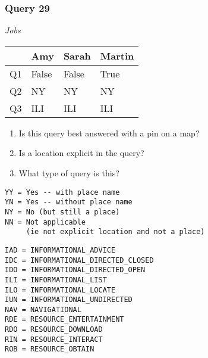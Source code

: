 \begin{frame}[fragile]
\frametitle{Query 29}
\vspace{1em}

\emph{Jobs}

\vfill

\begin{table}
  \centering
  \begin{tabular}{ l l l l }
    & \textbf{Amy} & \textbf{Sarah} & \textbf{Martin}\\
    \toprule
    Q1 & False & False & True\\
Q2 & NY & NY & NY\\
Q3 & ILI & ILI & ILI\\
    \bottomrule
  \end{tabular}
\end{table}

\vfill

\tiny{

\begin{enumerate}
\item Is this query best answered with a pin on a map?
\item Is a location explicit in the query?
\item What type of query is this?
\end{enumerate}

\vfill

\begin{multicols}{2}
\begin{verbatim}
YY = Yes -- with place name
YN = Yes -- without place name
NY = No (but still a place)
NN = Not applicable 
     (ie not explicit location and not a place)
\end{verbatim}

\columnbreak
\begin{verbatim}
IAD = INFORMATIONAL_ADVICE
IDC = INFORMATIONAL_DIRECTED_CLOSED
IDO = INFORMATIONAL_DIRECTED_OPEN
ILI = INFORMATIONAL_LIST
ILO = INFORMATIONAL_LOCATE
IUN = INFORMATIONAL_UNDIRECTED
NAV = NAVIGATIONAL
RDE = RESOURCE_ENTERTAINMENT
RDO = RESOURCE_DOWNLOAD
RIN = RESOURCE_INTERACT
ROB = RESOURCE_OBTAIN
\end{verbatim}
\end{multicols}
}

\end{frame}


